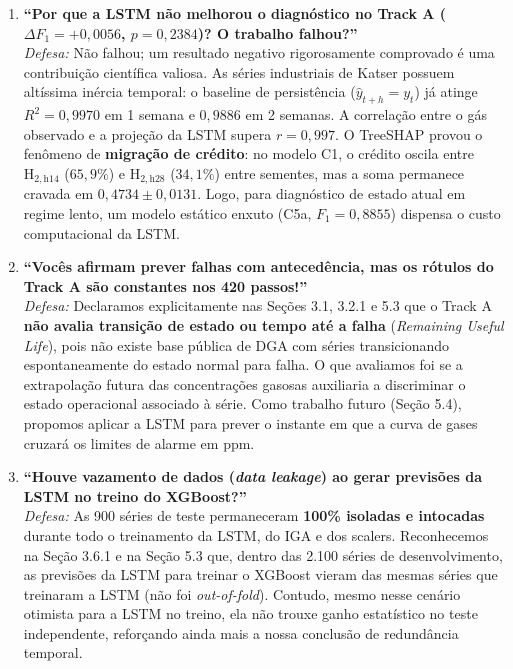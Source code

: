 \documentclass[10pt,a4paper]{article}
\begin{document}
\begin{defensecard}
\footnotesize
\begin{enumerate}[leftmargin=0.5cm, itemsep=3pt]
  \item \textbf{``Por que a LSTM não melhorou o diagnóstico no Track A ($\Delta F_1 = +0{,}0056$, $p = 0{,}2384$)? O trabalho falhou?''}\\
  \textit{Defesa:} Não falhou; um resultado negativo rigorosamente comprovado é uma contribuição científica valiosa. As séries industriais de Katser possuem altíssima inércia temporal: o baseline de persistência ($\hat{y}_{t+h} = y_t$) já atinge $R^2 = 0{,}9970$ em 1 semana e $0{,}9886$ em 2 semanas. A correlação entre o gás observado e a projeção da LSTM supera $r = 0{,}997$. O TreeSHAP provou o fenômeno de \textbf{migração de crédito}: no modelo C1, o crédito oscila entre $\text{H}_{2,\text{h14}}$ ($65{,}9\%$) e $\text{H}_{2,\text{h28}}$ ($34{,}1\%$) entre sementes, mas a soma permanece cravada em $0{,}4734 \pm 0{,}0131$. Logo, para diagnóstico de estado atual em regime lento, um modelo estático enxuto (C5a, $F_1 = 0{,}8855$) dispensa o custo computacional da LSTM.

  \item \textbf{``Vocês afirmam prever falhas com antecedência, mas os rótulos do Track A são constantes nos 420 passos!''}\\
  \textit{Defesa:} Declaramos explicitamente nas Seções 3.1, 3.2.1 e 5.3 que o Track A \textbf{não avalia transição de estado ou tempo até a falha} (\textit{Remaining Useful Life}), pois não existe base pública de DGA com séries transicionando espontaneamente do estado normal para falha. O que avaliamos foi se a extrapolação futura das concentrações gasosas auxiliaria a discriminar o estado operacional associado à série. Como trabalho futuro (Seção 5.4), propomos aplicar a LSTM para prever o instante em que a curva de gases cruzará os limites de alarme em ppm.

  \item \textbf{``Houve vazamento de dados (\textit{data leakage}) ao gerar previsões da LSTM no treino do XGBoost?''}\\
  \textit{Defesa:} As 900 séries de teste permaneceram \textbf{100\% isoladas e intocadas} durante todo o treinamento da LSTM, do IGA e dos scalers. Reconhecemos na Seção 3.6.1 e na Seção 5.3 que, dentro das 2.100 séries de desenvolvimento, as previsões da LSTM para treinar o XGBoost vieram das mesmas séries que treinaram a LSTM (não foi \textit{out-of-fold}). Contudo, mesmo nesse cenário otimista para a LSTM no treino, ela não trouxe ganho estatístico no teste independente, reforçando ainda mais a nossa conclusão de redundância temporal.


\end{enumerate}
\end{defensecard}
\end{document}
